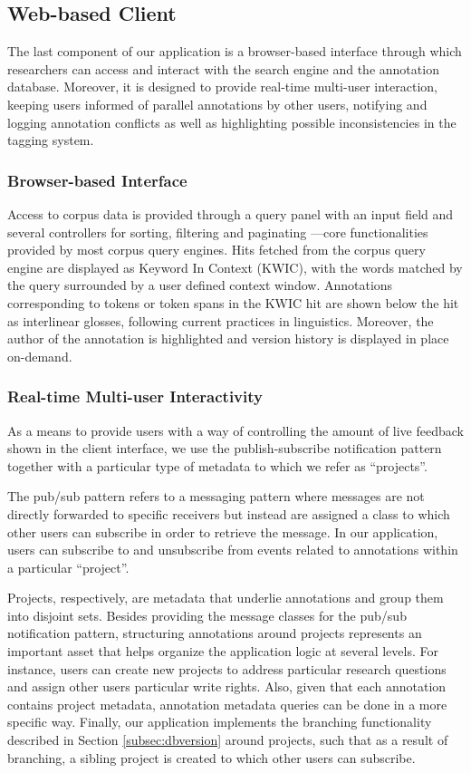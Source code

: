 \documentclass{sig-alternate}
\begin{document}
\subsection{Web-based Client}\label{subsec:client}

The last component of our application is a browser-based interface through which researchers
can access and interact with the search engine and the annotation database.
Moreover, it is designed to provide real-time multi-user interaction, keeping users informed of
parallel annotations by other users, notifying and logging annotation conflicts as well as
highlighting possible inconsistencies in the tagging system.

\subsubsection{Browser-based Interface}
Access to corpus data is provided through a query panel with an input field and several
controllers for sorting, filtering and paginating ---core functionalities provided by
most corpus query engines. Hits fetched from the corpus query engine are displayed as Keyword
In Context (KWIC), with the words matched by the query surrounded by a user defined context window.
Annotations corresponding to tokens or token spans in the KWIC hit are shown below the hit as
interlinear glosses, following current practices in linguistics. 
Moreover, the author of the annotation is highlighted and version history is displayed in place
on-demand.

\subsubsection{Real-time Multi-user Interactivity}
As a means to provide users with a way of controlling the amount of live feedback shown in the
client interface, we use the publish-subscribe notification pattern together with a particular
type of metadata to which we refer as ``projects''.

The pub/sub pattern refers to a messaging pattern where messages are not directly forwarded to
specific receivers but instead are assigned a class to which other users can subscribe in order to
retrieve the message. In our application, users can subscribe to and unsubscribe from events related
to annotations within a particular ``project''.

Projects, respectively, are metadata that underlie annotations and group them into disjoint sets.
Besides providing the message classes for the pub/sub notification pattern, structuring annotations
around projects represents an important asset that helps organize the application logic at
several levels. For instance, users can create new projects to address particular research questions
and assign other users particular write rights. Also, given that each annotation contains
project metadata, annotation metadata queries can be done in a more specific way.
Finally, our application implements the branching functionality described in Section
\ref{subsec:dbversion} around projects, such that as a result of branching, a sibling project is
created to which other users can subscribe.
\end{document}

